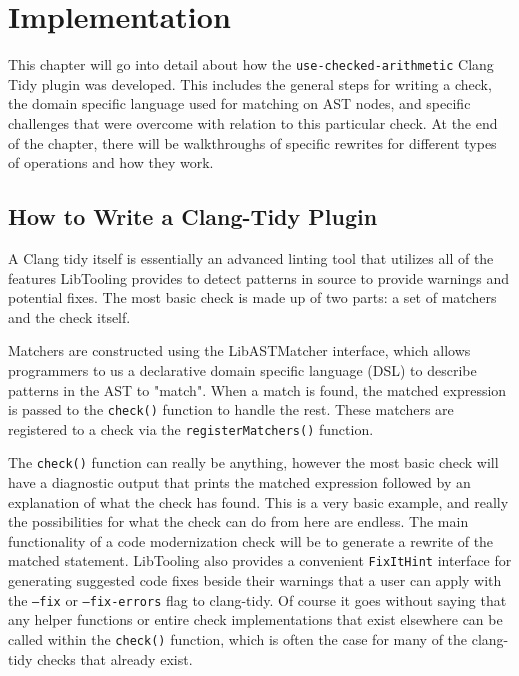 \chapter{Implementation}
\label{sec:implementation}

This chapter will go into detail about how the \texttt{use-checked-arithmetic} Clang Tidy plugin was developed. This includes the general steps for writing a check, the domain specific language used for matching on AST nodes, and specific challenges that were overcome with relation to this particular check. At the end of the chapter, there will be walkthroughs of specific rewrites for different types of operations and how they work.

\section{How to Write a Clang-Tidy Plugin}

A Clang tidy itself is essentially an advanced linting tool that utilizes all of the features LibTooling provides to detect patterns in source to provide warnings and potential fixes. The most basic check is made up of two parts: a set of matchers and the check itself.

Matchers are constructed using the LibASTMatcher interface, which allows programmers to us a declarative domain specific language (DSL) to describe patterns in the AST to "match". When a match is found, the matched expression is passed to the \texttt{check()} function to handle the rest. These matchers are registered to a check via the \texttt{registerMatchers()} function.

The \texttt{check()} function can really be anything, however the most basic check will have a diagnostic output that prints the matched expression followed by an explanation of what the check has found. This is a very basic example, and really the possibilities for what the check can do from here are endless. The main functionality of a code modernization check will be to generate a rewrite of the matched statement. LibTooling also provides a convenient \texttt{FixItHint} interface for generating suggested code fixes beside their warnings that a user can apply with the \texttt{--fix} or \texttt{--fix-errors} flag to clang-tidy. Of course it goes without saying that any helper functions or entire check implementations that exist elsewhere can be called within the \texttt{check()} function, which is often the case for many of the clang-tidy checks that already exist.

